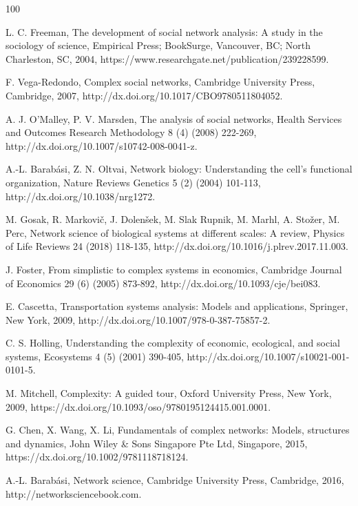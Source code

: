\documentclass{article}
\begin{document}

\begin{thebibliography}{100}
	
	L. C. Freeman, The development of social network analysis: A study in the sociology of science, Empirical Press; BookSurge, Vancouver, BC; North Charleston, SC, 2004, https://www.researchgate.net/publication/239228599.
	
	F. Vega-Redondo, Complex social networks, Cambridge University Press, Cambridge, 2007, http://dx.doi.org/10.1017/CBO9780511804052.
	
	A. J. O'Malley, P. V. Marsden, The analysis of social networks, Health Services and Outcomes Research Methodology 8 (4) (2008) 222-269, http://dx.doi.org/10.1007/s10742-008-0041-z.
	
	A.-L. Barabási, Z. N. Oltvai, Network biology: Understanding the cell's functional organization, Nature Reviews Genetics 5 (2) (2004) 101-113, http://dx.doi.org/10.1038/nrg1272.
	
	M. Gosak, R. Markovič, J. Dolenšek, M. Slak Rupnik, M. Marhl, A. Stožer, M. Perc, Network science of biological systems at different scales: A review, Physics of Life Reviews 24 (2018) 118-135, http://dx.doi.org/10.1016/j.plrev.2017.11.003.
	
	J. Foster, From simplistic to complex systems in economics, Cambridge Journal of Economics 29 (6) (2005) 873-892, http://dx.doi.org/10.1093/cje/bei083.
	
	E. Cascetta, Transportation systems analysis: Models and applications, Springer, New York, 2009, http://dx.doi.org/10.1007/978-0-387-75857-2.
	
	C. S. Holling, Understanding the complexity of economic, ecological, and social systems, Ecosystems 4 (5) (2001) 390-405, http://dx.doi.org/10.1007/s10021-001-0101-5.
	
	M. Mitchell, Complexity: A guided tour, Oxford University Press, New York, 2009, https://dx.doi.org/10.1093/oso/9780195124415.001.0001.
	
	G. Chen, X. Wang, X. Li, Fundamentals of complex networks: Models, structures and dynamics, John Wiley \& Sons Singapore Pte Ltd, Singapore, 2015, https://dx.doi.org/10.1002/9781118718124.
	
	A.-L. Barabási, Network science, Cambridge University Press, Cambridge, 2016, http://networksciencebook.com.
	

\end{thebibliography}
\end{document}
